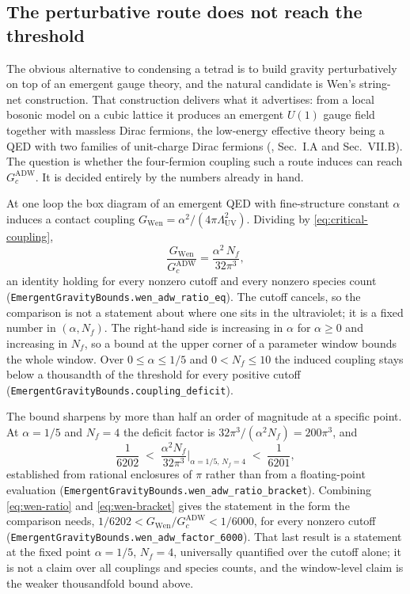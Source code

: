 \documentclass[aps,prd,nofootinbib,superscriptaddress,12pt]{revtex4-2}
\DeclareRobustCommand{\lb}{\discretionary{}{}{}}
\begin{document}
\subsection{The perturbative route does not reach the threshold}
\label{sec:substrate-wen}

The obvious alternative to condensing a tetrad is to build gravity
perturbatively on top of an emergent gauge theory, and the natural
candidate is Wen's string-net construction. That construction delivers what
it advertises: from a local bosonic model on a cubic lattice it produces an
emergent $U(1)$ gauge field together with massless Dirac fermions, the
low-energy effective theory being a QED with two families of unit-charge
Dirac fermions (\cite{Wen2003}, Sec.~I.A and Sec.~VII.B). The question is
whether the four-fermion coupling such a route induces can reach
$G_c^{\mathrm{ADW}}$. It is decided entirely by the numbers already in hand.

At one loop the box diagram of an emergent QED with fine-structure constant
$\alpha$ induces a contact coupling
$G_{\mathrm{Wen}} = \alpha^{2}/(4\pi\Lambda_{\mathrm{UV}}^{2})$. Dividing
by \eqref{eq:critical-coupling},
\begin{equation}
\label{eq:wen-ratio}
\frac{G_{\mathrm{Wen}}}{G_c^{\mathrm{ADW}}}
= \frac{\alpha^{2}\,N_f}{32\pi^{3}},
\end{equation}
an identity holding for every nonzero cutoff and every nonzero species
count (\texttt{Emergent\lb{}Gravity\lb{}Bounds.\lb{}wen\_\lb{}adw\_\lb{}ratio\_\lb{}eq}). The cutoff
cancels, so the comparison is not a statement about where one sits in the
ultraviolet; it is a fixed number in $(\alpha, N_f)$. The right-hand side
is increasing in $\alpha$ for $\alpha \ge 0$ and increasing in $N_f$, so a
bound at the upper corner of a parameter window bounds the whole window.
Over $0 \le \alpha \le 1/5$ and $0 < N_f \le 10$ the induced coupling stays
below a thousandth of the threshold for every positive cutoff
(\texttt{Emergent\lb{}Gravity\lb{}Bounds.\lb{}coupling\_\lb{}deficit}).

The bound sharpens by more than half an order of magnitude at a specific
point. At $\alpha = 1/5$ and $N_f = 4$ the deficit factor is
$32\pi^{3}/(\alpha^{2}N_f) = 200\pi^{3}$, and
\begin{equation}
\label{eq:wen-bracket}
\frac{1}{6202} \;<\; \frac{\alpha^{2}N_f}{32\pi^{3}}\biggr|_{\alpha=1/5,\,N_f=4} \;<\; \frac{1}{6201},
\end{equation}
established from rational enclosures of $\pi$ rather than from a
floating-point evaluation
(\texttt{Emergent\lb{}Gravity\lb{}Bounds.\lb{}wen\_\lb{}adw\_\lb{}ratio\_\lb{}bracket}). Combining
\eqref{eq:wen-ratio} and \eqref{eq:wen-bracket} gives the statement in the
form the comparison needs,
$1/6202 < G_{\mathrm{Wen}}/G_c^{\mathrm{ADW}} < 1/6000$, for every nonzero
cutoff (\texttt{Emergent\lb{}Gravity\lb{}Bounds.\lb{}wen\_\lb{}adw\_\lb{}factor\_\lb{}6000}). That last
result is a statement at the fixed point $\alpha = 1/5$, $N_f = 4$,
universally quantified over the cutoff alone; it is not a claim over all
couplings and species counts, and the window-level claim is the weaker
thousandfold bound above.
\end{document}
